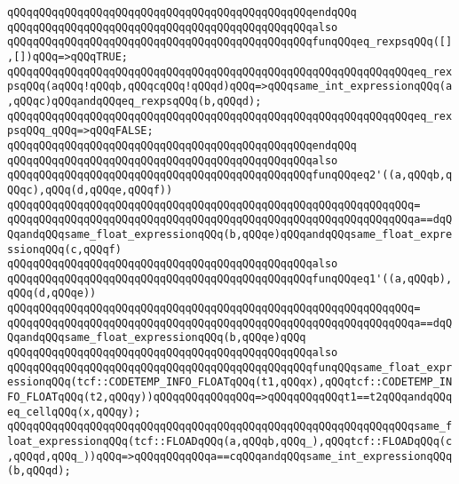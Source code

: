 \verb|qQQqqQQqqQQqqQQqqQQqqQQqqQQqqQQqqQQqqQQqqQQqqQQqendqQQq|\newline
\newline
\verb|qQQqqQQqqQQqqQQqqQQqqQQqqQQqqQQqqQQqqQQqqQQqqQQqalso|\newline
\verb|qQQqqQQqqQQqqQQqqQQqqQQqqQQqqQQqqQQqqQQqqQQqqQQqfunqQQqeq_rexpsqQQq([],[])qQQq=>qQQqTRUE;|\newline
\verb|qQQqqQQqqQQqqQQqqQQqqQQqqQQqqQQqqQQqqQQqqQQqqQQqqQQqqQQqqQQqqQQqeq_rexpsqQQq(aqQQq!qQQqb,qQQqcqQQq!qQQqd)qQQq=>qQQqsame_int_expressionqQQq(a,qQQqc)qQQqandqQQqeq_rexpsqQQq(b,qQQqd);|\newline
\verb|qQQqqQQqqQQqqQQqqQQqqQQqqQQqqQQqqQQqqQQqqQQqqQQqqQQqqQQqqQQqqQQqeq_rexpsqQQq_qQQq=>qQQqFALSE;|\newline
\verb|qQQqqQQqqQQqqQQqqQQqqQQqqQQqqQQqqQQqqQQqqQQqqQQqendqQQq|\newline
\newline
\verb|qQQqqQQqqQQqqQQqqQQqqQQqqQQqqQQqqQQqqQQqqQQqqQQqalso|\newline
\verb|qQQqqQQqqQQqqQQqqQQqqQQqqQQqqQQqqQQqqQQqqQQqqQQqfunqQQqeq2'((a,qQQqb,qQQqc),qQQq(d,qQQqe,qQQqf))|\newline
\verb|qQQqqQQqqQQqqQQqqQQqqQQqqQQqqQQqqQQqqQQqqQQqqQQqqQQqqQQqqQQqqQQq=|\newline
\verb|qQQqqQQqqQQqqQQqqQQqqQQqqQQqqQQqqQQqqQQqqQQqqQQqqQQqqQQqqQQqqQQqa==dqQQqandqQQqsame_float_expressionqQQq(b,qQQqe)qQQqandqQQqsame_float_expressionqQQq(c,qQQqf)|\newline
\newline
\verb|qQQqqQQqqQQqqQQqqQQqqQQqqQQqqQQqqQQqqQQqqQQqqQQqalso|\newline
\verb|qQQqqQQqqQQqqQQqqQQqqQQqqQQqqQQqqQQqqQQqqQQqqQQqfunqQQqeq1'((a,qQQqb),qQQq(d,qQQqe))|\newline
\verb|qQQqqQQqqQQqqQQqqQQqqQQqqQQqqQQqqQQqqQQqqQQqqQQqqQQqqQQqqQQqqQQq=|\newline
\verb|qQQqqQQqqQQqqQQqqQQqqQQqqQQqqQQqqQQqqQQqqQQqqQQqqQQqqQQqqQQqqQQqa==dqQQqandqQQqsame_float_expressionqQQq(b,qQQqe)qQQq|\newline
\newline
\verb|qQQqqQQqqQQqqQQqqQQqqQQqqQQqqQQqqQQqqQQqqQQqqQQqalso|\newline
\verb|qQQqqQQqqQQqqQQqqQQqqQQqqQQqqQQqqQQqqQQqqQQqqQQqfunqQQqsame_float_expressionqQQq(tcf::CODETEMP_INFO_FLOATqQQq(t1,qQQqx),qQQqtcf::CODETEMP_INFO_FLOATqQQq(t2,qQQqy))qQQqqQQqqQQqqQQq=>qQQqqQQqqQQqt1==t2qQQqandqQQqeq_cellqQQq(x,qQQqy);|\newline
\verb|qQQqqQQqqQQqqQQqqQQqqQQqqQQqqQQqqQQqqQQqqQQqqQQqqQQqqQQqqQQqqQQqsame_float_expressionqQQq(tcf::FLOADqQQq(a,qQQqb,qQQq_),qQQqtcf::FLOADqQQq(c,qQQqd,qQQq_))qQQq=>qQQqqQQqqQQqa==cqQQqandqQQqsame_int_expressionqQQq(b,qQQqd);|\newline
